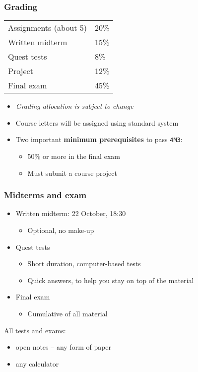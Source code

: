 \begin{frame}\frametitle{Grading}
	\begin{tabular}{ll}\\
		Assignments (about 5)       	& 20\% \\
	    Written midterm        			& 15\% \\
	    Quest tests						& 8\% \\
	    Project      					& 12\% \\
	    Final exam 						& 45\% \\
	\end{tabular}

	\vspace{12pt}
	\vspace{12pt}

	\begin{itemize}
		\item	\emph{Grading allocation is subject to change}
		\item	Course letters will be assigned using standard system
		\item	Two important \textbf{minimum prerequisites} to pass \texttt{4M3}:
		\begin{itemize}
			\item	50\% or more in the final exam
			\item	Must submit a course project
		\end{itemize}
	\end{itemize}
\end{frame}

\begin{frame}\frametitle{Midterms and exam}
	\begin{itemize}
		\item	Written midterm: 22 October, 18:30
		\begin{itemize}
			\item	Optional, no make-up
		\end{itemize}

		\item	Quest tests
		\begin{itemize}
			\item	Short duration, computer-based tests
			\item	Quick answers, to help you stay on top of the material
		\end{itemize}

		\item	Final exam
		\begin{itemize}
			\item	Cumulative of all material
		\end{itemize}
	\end{itemize}

	\vspace{12pt}
	All tests and exams:
	\begin{itemize}
		\item	open notes -- any form of paper
		\item	any calculator
	\end{itemize}
\end{frame}

